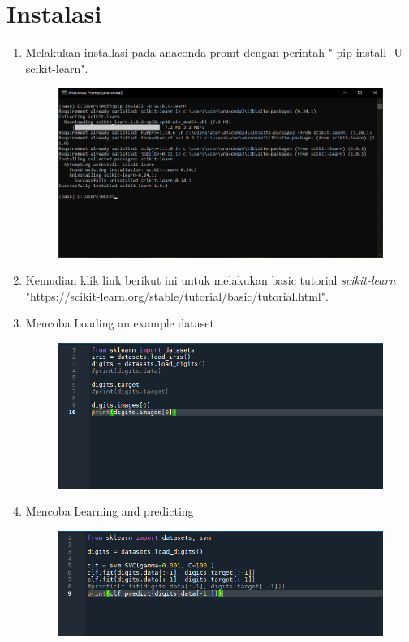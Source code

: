 \begin{enumerate}
\end{enumerate}


\section{Instalasi}

\begin{enumerate}
	\item Melakukan installasi pada anaconda promt dengan perintah " pip install -U scikit-learn".
	\begin{figure}[!htbp]
		\centering
		\includegraphics[scale=0.4]{figures/1.PNG}
	\end{figure}
	\newpage
	\item Kemudian klik link berikut ini untuk melakukan basic tutorial \textit{scikit-learn} "https://scikit-learn.org/stable/tutorial/basic/tutorial.html".
	\item
	Mencoba Loading an example dataset
	\begin{figure}[!htbp]
		\centering
		\includegraphics[scale=0.4]{figures/2.PNG}
	\end{figure}
	\item
	Mencoba Learning and predicting
	\begin{figure}[!htbp]
		\centering
		\includegraphics[scale=0.4]{figures/3.PNG}

\end{figure}
\end{enumerate}
